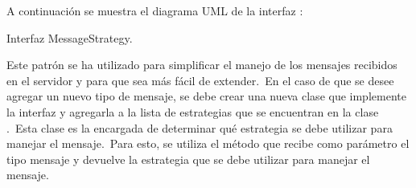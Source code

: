A continuación se muestra el diagrama UML de la interfaz :

\begin{umlDiagram}
	\centering

	\caption{Interfaz MessageStrategy.}
\end{umlDiagram}

Este patrón se ha utilizado para simplificar el manejo de los mensajes recibidos en el servidor y para que sea más
fácil de extender.\ En el caso de que se desee agregar un nuevo tipo de mensaje, se debe crear una nueva clase que
implemente la interfaz  y agregarla a la lista de estrategias que se encuentran en la
clase .\ Esta clase es la encargada de determinar qué estrategia se debe utilizar para
manejar el mensaje.\ Para esto, se utiliza el método  que
recibe como parámetro el tipo mensaje y devuelve la estrategia que se debe utilizar para manejar el mensaje.
